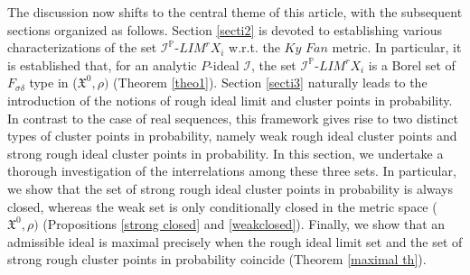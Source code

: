 \documentclass[reqno]{amsart}
\begin{document}
	
The discussion now shifts to the central theme of this article, with the subsequent sections organized as follows. Section \ref{secti2} is devoted to establishing various characterizations of the set $\mathcal{I}^{\mathbb{P}}$-$LIM^rX_i$ w.r.t. the $Ky$ $Fan$ metric. In particular, it is established that, for an analytic $P$-ideal $\mathcal{I}$, the set  $\mathcal{I}^{\mathbb{P}}$-$LIM^rX_i$ is a Borel set of $F_{\sigma\delta}$ type in ($\mathfrak{X}^0,\rho)$
(Theorem \ref{theo1}). Section \ref{secti3} naturally leads to the introduction of the notions of rough ideal limit and cluster points in probability. In contrast to the case of real sequences, this framework gives rise to two distinct types of cluster points in probability, namely weak rough ideal cluster points and strong rough ideal cluster points in probability. In this section, we undertake a thorough investigation of the interrelations among these three sets. In particular, we show that the set of strong rough ideal cluster points in probability is always closed, whereas the weak set is only conditionally closed in the metric space ($\mathfrak{X}^0,\rho)$ (Propositions \ref{strong closed} and \ref{weakclosed}). Finally, we show that an admissible ideal is maximal precisely when the rough ideal limit set and the set of strong rough cluster points in probability coincide (Theorem \ref{maximal th}).
	
	
	
\end{document}
